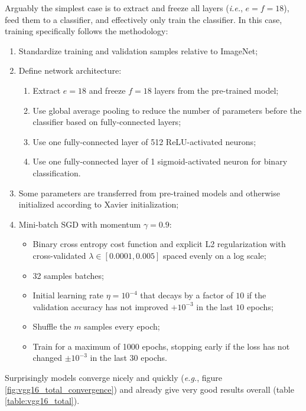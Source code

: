 Arguably the simplest case is to extract and freeze all layers (\textit{i.e.}, $e = f = 18$), feed them to a classifier, and effectively only train the classifier. In this case, training specifically follows the methodology:

\begin{enumerate}
    \item Standardize training and validation samples relative to ImageNet;
    \item Define network architecture:
        \begin{enumerate}
            \item Extract $e = 18$ and freeze $f = 18$ layers from the pre-trained model;
            \item Use global average pooling to reduce the number of parameters before the classifier based on fully-connected layers;
            \item Use one fully-connected layer of 512 ReLU-activated neurons;
            \item Use one fully-connected layer of 1 sigmoid-activated neuron for binary classification.
        \end{enumerate}
    \item Some parameters are transferred from pre-trained models and otherwise initialized according to Xavier \cite{xavierinit} initialization;
    \item Mini-batch \ac{SGD} with momentum $\gamma = 0.9$:
        \begin{itemize}
            \item Binary cross entropy cost function and explicit L2 regularization with cross-validated $\lambda \in [0.0001, 0.005]$ spaced evenly on a log scale;
            \item 32 samples batches;
            \item Initial learning rate $\eta = 10^{-4}$ that decays by a factor of $10$ if the validation accuracy has not improved $+10^{-3}$ in the last $10$ epochs;
            \item Shuffle the $m$ samples every epoch;
            \item Train for a maximum of 1000 epochs, stopping early if the loss has not changed $\pm 10^{-3}$ in the last $30$ epochs.
        \end{itemize}
\end{enumerate}

Surprisingly models converge nicely and quickly (\textit{e.g.}, figure \ref{fig:vgg16_total_convergence}) and already give very good results overall (table \ref{table:vgg16_total}).

